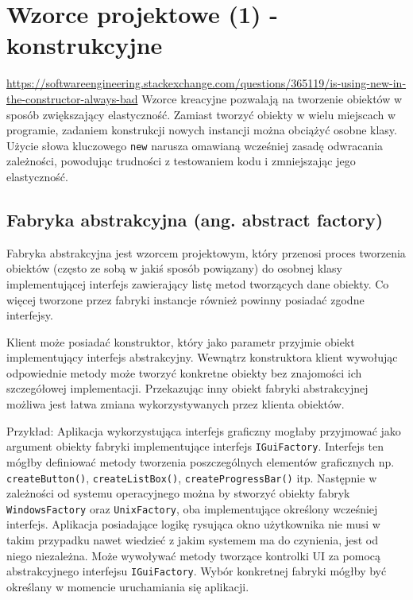 \section{Wzorce projektowe (1) - konstrukcyjne}
\url{https://softwareengineering.stackexchange.com/questions/365119/is-using-new-in-the-constructor-always-bad}
Wzorce kreacyjne pozwalają na tworzenie obiektów w sposób zwiększający elastyczność. Zamiast tworzyć obiekty w wielu miejscach w programie, zadaniem konstrukcji nowych instancji można obciążyć osobne klasy. Użycie słowa kluczowego \texttt{new} narusza omawianą wcześniej zasadę odwracania zależności, powodując trudności z testowaniem kodu i zmniejszając jego elastyczność. 

\subsection{Fabryka abstrakcyjna (ang. abstract factory)}
Fabryka abstrakcyjna jest wzorcem projektowym, który przenosi proces tworzenia obiektów (często ze sobą w jakiś sposób powiązany) do osobnej klasy implementującej interfejs zawierający listę metod tworzących dane obiekty. Co więcej tworzone przez fabryki instancje również powinny posiadać zgodne interfejsy.

Klient może posiadać konstruktor, który jako parametr przyjmie obiekt implementujący interfejs abstrakcyjny. Wewnątrz konstruktora klient wywołując odpowiednie metody może tworzyć konkretne obiekty bez znajomości ich szczegółowej implementacji. Przekazując inny obiekt fabryki abstrakcyjnej możliwa jest łatwa zmiana wykorzystywanych przez klienta obiektów.  

Przykład:
Aplikacja wykorzystująca interfejs graficzny mogłaby przyjmować jako argument obiekty fabryki implementujące interfejs \texttt{IGuiFactory}. Interfejs ten mógłby definiować metody tworzenia poszczególnych elementów graficznych np. \texttt{createButton()}, \texttt{createListBox()}, \texttt{createProgressBar()} itp. Następnie w zależności od systemu operacyjnego można by stworzyć obiekty fabryk \texttt{WindowsFactory} oraz \texttt{UnixFactory}, oba implementujące określony wcześniej interfejs. Aplikacja posiadające logikę rysująca okno użytkownika nie musi w takim przypadku nawet wiedzieć z jakim systemem ma do czynienia, jest od niego niezależna. Może wywoływać metody tworzące kontrolki UI za pomocą abstrakcyjnego interfejsu \texttt{IGuiFactory}. Wybór konkretnej fabryki mógłby być określany w momencie uruchamiania się aplikacji.



